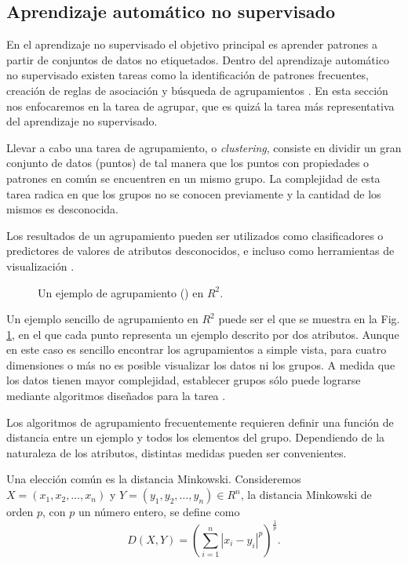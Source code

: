 \subsection{Aprendizaje automático no supervisado}

En el aprendizaje no supervisado el objetivo principal es aprender patrones a partir de conjuntos de datos no etiquetados. Dentro del aprendizaje automático no supervisado existen tareas como la identificación de patrones frecuentes, creación de reglas de asociación y búsqueda de agrupamientos \cite{kubat_introduction_2017}. En esta sección nos enfocaremos en la tarea de agrupar, que es quizá la tarea más representativa del aprendizaje no supervisado. 

Llevar a cabo una tarea de agrupamiento, o \textit{clustering}, consiste en dividir un gran conjunto de datos (puntos) de tal manera que los puntos con propiedades o patrones en común se encuentren en un mismo grupo. La complejidad de esta tarea radica en que los grupos no se conocen previamente y la cantidad de los mismos es desconocida. 

Los resultados de un agrupamiento pueden ser utilizados como clasificadores o predictores de valores de atributos desconocidos, e incluso como herramientas de visualización \cite{kubat_introduction_2017}.

 \begin{figure}[htbp]
   \centering
   
    \caption{Un ejemplo de agrupamiento () en $R^2$.}
    \label{fig:clustering-example}
\end{figure}

Un ejemplo sencillo de agrupamiento en $R^2$ puede ser el que se muestra en la Fig. \ref{fig:clustering-example}, en el que cada punto representa un ejemplo descrito por dos atributos. Aunque en este caso es sencillo encontrar los agrupamientos a simple vista, para cuatro dimensiones o más no es posible visualizar los datos ni los grupos. A medida que los datos tienen mayor complejidad, establecer grupos sólo puede lograrse mediante algoritmos diseñados para la tarea \cite{kubat_introduction_2017}.

Los algoritmos de agrupamiento frecuentemente requieren definir una función de distancia entre un ejemplo y todos los elementos del grupo. Dependiendo de la naturaleza de los atributos, distintas medidas pueden ser convenientes. 

Una elección común es la distancia Minkowski. Consideremos $X = (x_1,x_2,\ldots,x_n)$ y $Y=(y_1,y_2,\ldots ,y_n) \in R^n$, la distancia Minkowski de orden $p$, con $p$ un número entero, se define como 
$$D(X,Y) = (\sum_{i=1}^{n}|x_{i}-y_{i}|^{p})^{\frac{1}{p}}.$$

